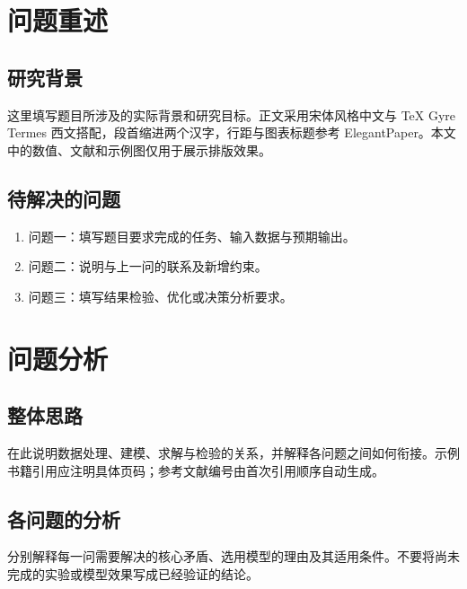 \section{问题重述}
\subsection{研究背景}
这里填写题目所涉及的实际背景和研究目标。正文采用宋体风格中文与 TeX Gyre Termes 西文搭配，段首缩进两个汉字，行距与图表标题参考 ElegantPaper。本文中的数值、文献和示例图仅用于展示排版效果。

\subsection{待解决的问题}
\begin{enumerate}
  \item 问题一：填写题目要求完成的任务、输入数据与预期输出。
  \item 问题二：说明与上一问的联系及新增约束。
  \item 问题三：填写结果检验、优化或决策分析要求。
\end{enumerate}

\section{问题分析}
\subsection{整体思路}
在此说明数据处理、建模、求解与检验的关系，并解释各问题之间如何衔接。示例书籍引用应注明具体页码\cite[第23--25页]{samplebook}；参考文献编号由首次引用顺序自动生成。

\subsection{各问题的分析}
分别解释每一问需要解决的核心矛盾、选用模型的理由及其适用条件。不要将尚未完成的实验或模型效果写成已经验证的结论。
